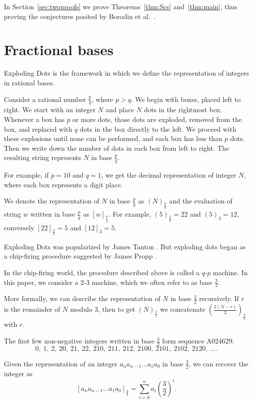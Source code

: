 \documentclass[12pt,reqno]{article}
\theoremstyle{plain}
\theoremstyle{definition}
\theoremstyle{remark}
\begin{document}
In Section~\ref{sec:twoproofs} we prove Theorems~\ref{thm:Scs} and~\ref{thm:main}, thus proving the conjectures posited by Borodin et al.~\cite{PSS}.



\section{Fractional bases}\label{sec:fracbases}

Exploding Dots is the framework in which we define the representation of integers in rational bases. 

Consider a rational number $\frac{p}{q}$, where $p > q$. We begin with boxes, placed left to right. We start with an integer $N$ and place $N$ dots in the rightmost box. Whenever a box has $p$ or more dots, those dots are exploded, removed from the box, and replaced with $q$ dots in the box directly to the left. We proceed with these explosions until none can be performed, and each box has less than $p$ dots. Then we write down the number of dots in each box from left to right. The resulting string represents $N$ in base $\frac{p}{q}$.

For example, if $p=10$ and $q=1$, we get the decimal representation of integer $N$, where each box represents a digit place.

We denote the representation of $N$ in base $\frac{p}{q}$ as $(N)_{\frac{p}{q}}$  and the evaluation of string $w$ written in base $\frac{p}{q}$ as $[w]_{\frac{p}{q}}$. For example, $(5)_{\frac{3}{2}} = 22$ and $(5)_3 = 12$, conversely $[22]_{\frac{3}{2}} = 5$ and $[12]_3 = 5$.

Exploding Dots was popularized by James Tanton \cite{JT}. But exploding dots began as a chip-firing procedure suggested by James Propp \cite{JP}.

In the chip-firing world, the procedure described above is called a $q$-$p$ machine.
In this paper, we consider a 2-3 machine, which we often refer to as base $\frac{3}{2}$. 

More formally, we can describe the representation of $N$ in base $\frac{3}{2}$ recursively. If $r$ is the remainder of $N$ modulo 3, then to get $(N)_{\frac{3}{2}}$ we concatenate  $\left(\frac{2(N-r)}{3}\right)_{\frac{3}{2}}$ with $r$.

The first few non-negative integers written in base $\frac{3}{2}$ form sequence A024629:
\[0,\ 1,\ 2,\ 20,\ 21,\ 22,\ 210,\ 211,\ 212,\ 2100,\ 2101,\ 2102,\ 2120,\  \ldots.\]
	
Given the representation of an integer $a_na_{n-1}\ldots a_1a_0$ in base $\frac{3}{2}$, we can recover the integer as 
\[[a_na_{n-1}\ldots a_1a_0]_{\frac{3}{2}} = \sum\limits_{i=0}^n a_i\left(\frac{3}{2}\right)^i.\]
\end{document}
